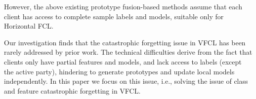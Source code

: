 However, the above existing prototype fusion-based methods assume that each client has access to complete sample labels and models, suitable only for Horizontal FCL.



Our investigation finds that the catastrophic forgetting issue in VFCL has been rarely addressed by prior work. 
The technical difficulties derive from the fact that  clients only have partial features and models, and lack access to labels (except the active party), hindering to generate prototypes and update local models independently.
In this paper we focus on this issue, i.e., solving the issue of class and feature catastrophic forgetting in VFCL.


